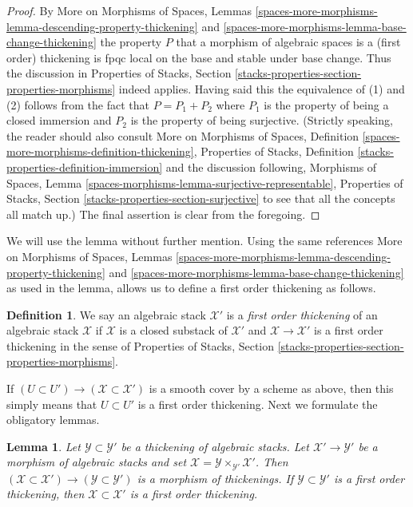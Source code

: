 \documentclass{stacks-project}
\theoremstyle{plain}
\newtheorem{lemma}[subsection]{Lemma}
\theoremstyle{definition}
\newtheorem{definition}[subsection]{Definition}
\theoremstyle{remark}
\numberwithin{equation}{subsection}
\begin{document}
\begin{proof}
By More on Morphisms of Spaces, Lemmas
\ref{spaces-more-morphisms-lemma-descending-property-thickening} and
\ref{spaces-more-morphisms-lemma-base-change-thickening}
the property $P$ that a morphism of algebraic spaces is a
(first order) thickening is fpqc local on the base and stable under base
change. Thus the discussion in Properties of Stacks, Section
\ref{stacks-properties-section-properties-morphisms} indeed applies.
Having said this the equivalence of (1) and (2) follows from
the fact that $P = P_1 + P_2$ where $P_1$ is the property of being
a closed immersion and $P_2$ is the property of being surjective.
(Strictly speaking, the reader should also consult
More on Morphisms of Spaces, Definition
\ref{spaces-more-morphisms-definition-thickening},
Properties of Stacks, Definition \ref{stacks-properties-definition-immersion}
and the discussion following, Morphisms of Spaces, Lemma
\ref{spaces-morphisms-lemma-surjective-representable},
Properties of Stacks, Section \ref{stacks-properties-section-surjective}
to see that all the concepts all match up.)
The final assertion is clear from the foregoing.
\end{proof}

\noindent
We will use the lemma without further mention. Using the same references
More on Morphisms of Spaces, Lemmas
\ref{spaces-more-morphisms-lemma-descending-property-thickening} and
\ref{spaces-more-morphisms-lemma-base-change-thickening}
as used in the lemma, allows us to define a first order thickening as follows.

\begin{definition}
\label{definition-first-order-thickening}
We say an algebraic stack $\mathcal{X}'$ is a {\it first order thickening}
of an algebraic stack $\mathcal{X}$ if $\mathcal{X}$ is a closed substack
of $\mathcal{X}'$ and $\mathcal{X} \to \mathcal{X}'$ is a first order
thickening in the sense of Properties of Stacks, Section
\ref{stacks-properties-section-properties-morphisms}.
\end{definition}

\noindent
If $(U \subset U') \to (\mathcal{X} \subset \mathcal{X}')$ is a smooth
cover by a scheme as above, then this simply means that $U \subset U'$
is a first order thickening. Next we formulate the obligatory lemmas.

\begin{lemma}
\label{lemma-base-change-thickening}
Let $\mathcal{Y} \subset \mathcal{Y}'$ be a thickening of algebraic stacks.
Let $\mathcal{X}' \to \mathcal{Y}'$ be a morphism of algebraic stacks
and set $\mathcal{X} = \mathcal{Y} \times_{\mathcal{Y}'} \mathcal{X}'$.
Then
$(\mathcal{X} \subset \mathcal{X}') \to (\mathcal{Y} \subset \mathcal{Y}')$
is a morphism of thickenings. If $\mathcal{Y} \subset \mathcal{Y}'$ is a first
order thickening, then $\mathcal{X} \subset \mathcal{X}'$ is a first
order thickening.
\end{lemma}
\end{document}
